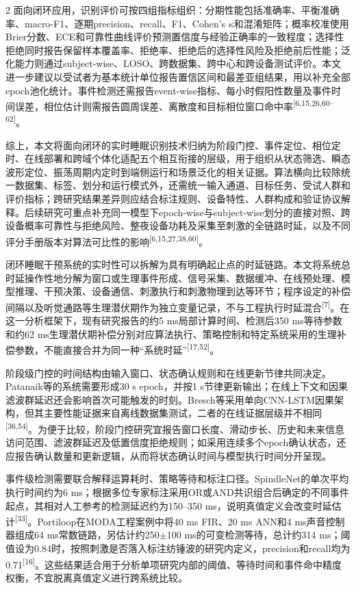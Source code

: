 \documentclass[UTF8,zihao=5,fontset=none]{ctexart}
\newcommand{\hei}{\CJKfamily{hei}}
\newcommand{\leveltwo}[1]{%
  \par\noindent{\hei\fontsize{10pt}{12pt}\selectfont\bfseries #1\par}}
\newcommand{\refcite}[1]{\nolinebreak[4]\textsuperscript{[#1]}}
\begin{document}
\begin{multicols}{2}
面向闭环应用，识别评价可按四组指标组织：分期性能包括准确率、平衡准确率、macro-F1、逐期precision、recall、F1、Cohen's $\kappa$和混淆矩阵；概率校准使用Brier分数、ECE和可靠性曲线评价预测置信度与经验正确率的一致程度；选择性拒绝同时报告保留样本覆盖率、拒绝率、拒绝后的选择性风险及拒绝前后性能；泛化能力则通过subject-wise、LOSO、跨数据集、跨中心和跨设备测试评价。本文进一步建议以受试者为基本统计单位报告置信区间和最差亚组结果，用以补充全部epoch池化统计。事件检测还需报告event-wise指标、每小时假阳性数量及事件时间误差，相位估计则需报告圆周误差、离散度和目标相位窗口命中率\refcite{6,15,26,60--62}。\par

综上，本文将面向闭环的实时睡眠识别技术归纳为阶段门控、事件定位、相位定时、在线部署和跨域个体化适配五个相互衔接的层级，用于组织从状态筛选、瞬态波形定位、振荡周期内定时到端侧运行和场景泛化的相关证据。算法横向比较除统一数据集、标签、划分和运行模式外，还需统一输入通道、目标任务、受试人群和评价指标；跨研究结果差异则应结合标注规则、设备特性、人群构成和验证协议解释。后续研究可重点补充同一模型下epoch-wise与subject-wise划分的直接对照、跨设备概率可靠性与拒绝风险、整夜设备功耗及采集至刺激的全链路时延，以及不同评分手册版本对算法可比性的影响\refcite{6,15,27,38,60}。\par

\leveltwo{2.3 闭环时延链路、同步机制与机会级评价}

闭环睡眠干预系统的实时性可以拆解为具有明确起止点的时延链路。本文将系统总时延操作性地分解为窗口或生理事件形成、信号采集、数据缓冲、在线预处理、模型推理、干预决策、设备通信、刺激执行和刺激物理到达等环节；程序设定的补偿间隔以及听觉通路等生理潜伏期作为独立变量记录，不与工程执行时延混合\refcite{7}。在这一分析框架下，现有研究报告的约5 ms局部计算时间、检测后350 ms等待参数和约62 ms生理潜伏期补偿分别对应算法执行、策略控制和特定系统采用的生理补偿参数，不能直接合并为同一种“系统时延”\refcite{17,52}。\par

阶段级门控的时间结构由输入窗口、状态确认规则和在线更新节律共同决定。Patanaik等的系统需要形成30 s epoch，并按1 s节律更新输出；在线上下文和因果滤波群延迟还会影响首次可能触发的时刻。Bresch等采用单向CNN-LSTM因果架构，但其主要性能证据来自离线数据集测试，二者的在线证据层级并不相同\refcite{36,54}。为便于比较，阶段门控研究宜报告窗口长度、滑动步长、历史和未来信息访问范围、滤波群延迟及低置信度拒绝规则；如采用连续多个epoch确认状态，还应报告确认数量和更新逻辑，从而将状态确认时间与模型执行时间分开呈现。\par

事件级检测需要联合解释运算耗时、策略等待和标注口径。SpindleNet的单次平均执行时间约为6 ms；根据多位专家标注采用OR或AND共识组合后确定的不同事件起点，其相对人工参考的检测延迟约为150--350 ms，说明真值定义会改变时延估计\refcite{33}。Portiloop在MODA工程案例中将40 ms FIR、20 ms ANN和4 ms声音控制器组成64 ms常数链路，另估计约250$\pm$100 ms的可变检测等待，总计约314 ms；阈值设为0.84时，按照刺激是否落入标注纺锤波的研究内定义，precision和recall均为0.71\refcite{16}。这些结果适合用于分析单项研究内部的阈值、等待时间和事件命中精度权衡，不宜脱离真值定义进行跨系统比较。\par


\end{multicols}
\end{document}
